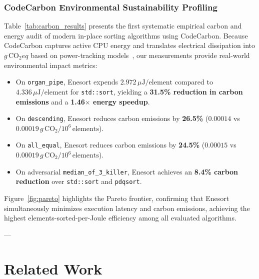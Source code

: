 \documentclass[journal]{IEEEtran}
\begin{document}
\subsubsection{CodeCarbon Environmental Sustainability Profiling}
Table~\ref{tab:carbon_results} presents the first systematic empirical carbon and energy audit of modern in-place sorting algorithms using CodeCarbon. Because CodeCarbon captures active CPU energy and translates electrical dissipation into $g\,\text{CO}_2eq$ based on power-tracking models~\cite{codecarbon2025groundtruthing}, our measurements provide real-world environmental impact metrics:
\begin{itemize}
    \item On \texttt{organ\_pipe}, Enesort expends $2.972\,\mu\text{J}/\text{element}$ compared to $4.336\,\mu\text{J}/\text{element}$ for \texttt{std::sort}, yielding a \textbf{31.5\% reduction in carbon emissions} and a \textbf{1.46$\times$ energy speedup}.
    \item On \texttt{descending}, Enesort reduces carbon emissions by \textbf{26.5\%} ($0.00014$ vs $0.00019\,g\,\text{CO}_2 / 10^6\,\text{elements}$).
    \item On \texttt{all\_equal}, Enesort reduces carbon emissions by \textbf{24.5\%} ($0.00015$ vs $0.00019\,g\,\text{CO}_2 / 10^6\,\text{elements}$).
    \item On adversarial \texttt{median\_of\_3\_killer}, Enesort achieves an \textbf{8.4\% carbon reduction} over \texttt{std::sort} and \texttt{pdqsort}.
\end{itemize}

Figure~\ref{fig:pareto} highlights the Pareto frontier, confirming that Enesort simultaneously minimizes execution latency and carbon emissions, achieving the highest elements-sorted-per-Joule efficiency among all evaluated algorithms.

---

\section{Related Work}
\end{document}

